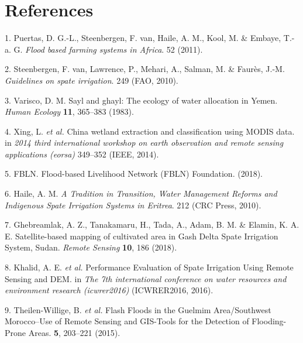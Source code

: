 \documentclass[12pt,oneside]{article}
\begin{document}
\clearpage

\hypertarget{references}{%
\section*{References}\label{references}}

\hypertarget{refs}{}
\leavevmode\hypertarget{ref-Puertas_et_al_2011}{}%
1. Puertas, D. G.-L., Steenbergen, F. van, Haile, A. M., Kool, M. \& Embaye, T.-a. G. \emph{Flood based farming systems in Africa}. 52 (2011).

\leavevmode\hypertarget{ref-VanSteenbergen_et_al_2010}{}%
2. Steenbergen, F. van, Lawrence, P., Mehari, A., Salman, M. \& Faurès, J.-M. \emph{Guidelines on spate irrigation}. 249 (FAO, 2010).

\leavevmode\hypertarget{ref-Varisco_1983}{}%
3. Varisco, D. M. Sayl and ghayl: The ecology of water allocation in Yemen. \emph{Human Ecology} \textbf{11}, 365--383 (1983).

\leavevmode\hypertarget{ref-Xing_et_al_2014}{}%
4. Xing, L. \emph{et al.} China wetland extraction and classification using MODIS data. in \emph{2014 third international workshop on earth observation and remote sensing applications (eorsa)} 349--352 (IEEE, 2014).

\leavevmode\hypertarget{ref-FBLN_2018}{}%
5. FBLN. Flood-based Livelihood Network (FBLN) Foundation. (2018).

\leavevmode\hypertarget{ref-Haile_2010}{}%
6. Haile, A. M. \emph{A Tradition in Transition, Water Management Reforms and Indigenous Spate Irrigation Systems in Eritrea}. 212 (CRC Press, 2010).

\leavevmode\hypertarget{ref-Ghebreamlak_et_al_2018}{}%
7. Ghebreamlak, A. Z., Tanakamaru, H., Tada, A., Adam, B. M. \& Elamin, K. A. E. Satellite-based mapping of cultivated area in Gash Delta Spate Irrigation System, Sudan. \emph{Remote Sensing} \textbf{10}, 186 (2018).

\leavevmode\hypertarget{ref-Khalid_et_al_2016}{}%
8. Khalid, A. E. \emph{et al.} Performance Evaluation of Spate Irrigation Using Remote Sensing and DEM. in \emph{The 7th international conference on water resources and environment research (icwrer2016)} (ICWRER2016, 2016).

\leavevmode\hypertarget{ref-Theilen-Willige_et_al_2015}{}%
9. Theilen-Willige, B. \emph{et al.} Flash Floods in the Guelmim Area/Southwest Morocco--Use of Remote Sensing and GIS-Tools for the Detection of Flooding-Prone Areas. \textbf{5}, 203--221 (2015).
\end{document}
